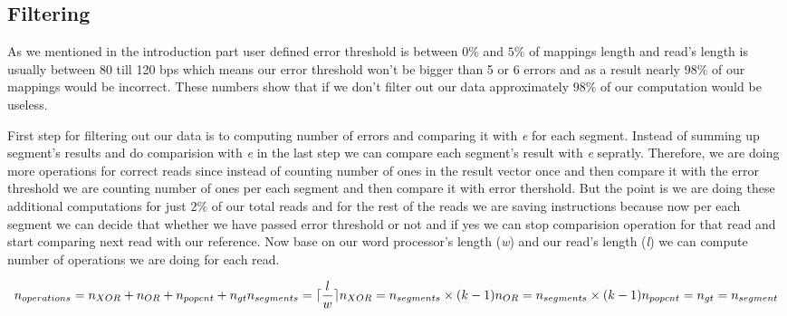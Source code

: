 \subsection{Filtering}
As we mentioned in the introduction part user defined error threshold is between $0\%$ and $5\%$ of mappings length and read's length is usually between 80 till 120 bps which means our error threshold won't be bigger than 5 or 6 errors and as a result nearly $98\%$ of our mappings would be incorrect. These numbers show that if we don't filter out our data approximately $98\%$ of our computation would be useless. 

First step for filtering out our data is to computing number of errors and comparing it with \emph{e} for each segment. Instead of summing up segment's results and do comparision with \emph{e} in the last step we can compare each segment's result with \emph{e} sepratly. Therefore, we are doing more operations for correct reads since instead of counting number of ones in the result vector once and then compare it with the error threshold we are counting number of ones per each segment and then compare it with error thershold.  But the point is we are doing these additional computations for just $2\%$ of our total reads and for the rest of the reads we are saving instructions because now per each segment we can decide that whether we have passed error threshold or not and if yes we can stop comparision operation for that read and start comparing next read with our reference. Now base on our word processor's length (\emph{w}) and our read's length (\emph{l}) we can compute number of operations we are doing for each read.

\begin{equation}
\nonumber
n_{operations} = n_{XOR} + n_{OR} + n_{popcnt} + n_{gt} \\


n_{segments} =  \lceil \frac{l}{w} \rceil \\


n_{XOR} = n_{segments} \times (k-1) \\


n_{OR} = n_{segments} \times (k-1) \\


n_{popcnt} = n_{gt} = n_{segment} \\

\end{equation}  
  
